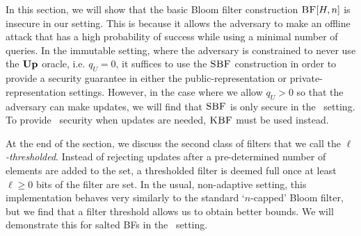 In this section, we will show that the basic Bloom filter construction
$\textnormal{\textsc{BF}}[H,n]$ is insecure in our setting. This is because it allows the adversary to
make an offline attack that has a high probability of success while using a
minimal number of queries. In the immutable setting, where the adversary is
constrained to never use the $\textup{\textbf{Up}}\hspace{0.5pt}$ oracle, i.e. $q_U = 0$, it suffices to use
the $\textnormal{\textsc{SBF}}$ construction in order to provide a security guarantee in either the
public-representation or private-representation settings. However, in the case
where we allow $q_U > 0$ so that the adversary can make updates, we will find
that $\textnormal{\textsc{SBF}}$ is only secure in the \erreps\ setting. To provide \errep\ security
when updates are needed, $\textnormal{\textsc{KBF}}$ must be used instead.

At the end of the section, we discuss the second class of filters that we call the
\emph{$\ell$-thresholded}. Instead of rejecting updates after a pre-determined
number of elements are added to the set, a thresholded filter is deemed full
once at least $\ell\geq0$ bits of the filter are set.
%
In the usual, non-adaptive setting, this implementation behaves very
similarly to the standard `$n$-capped' Bloom filter, but we find that a filter threshold
allows us to obtain better bounds.
%
We will demonstrate this for salted BFs in the \erreps\ setting.
%


